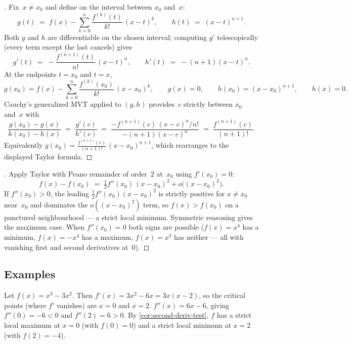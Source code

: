 \begin{proof}[]
Fix~$x \neq x_0$ and define on the interval between $x_0$ and~$x$:
\[
  g(t) \;=\; f(x) - \sum_{k=0}^{n} \frac{f^{(k)}(t)}{k!}\,(x - t)^k,
  \qquad
  h(t) \;=\; (x - t)^{n+1}.
\]
Both $g$ and $h$ are differentiable on the chosen interval; computing
$g'$ telescopically (every term except the last cancels) gives
\[
  g'(t) \;=\; -\frac{f^{(n+1)}(t)}{n!}\,(x - t)^n,
  \qquad
  h'(t) \;=\; -(n+1)(x - t)^n.
\]
At the endpoints $t = x_0$ and $t = x$,
\[
  g(x_0) = f(x) - \sum_{k=0}^{n} \frac{f^{(k)}(x_0)}{k!}\,(x - x_0)^k,
  \qquad
  g(x) = 0,
  \qquad
  h(x_0) = (x - x_0)^{n+1},
  \qquad
  h(x) = 0.
\]
Cauchy's generalized MVT applied to $(g, h)$ provides~$c$ strictly
between $x_0$ and~$x$ with
\[
  \frac{g(x_0) - g(x)}{h(x_0) - h(x)} \;=\; \frac{g'(c)}{h'(c)}
  \;=\; \frac{-f^{(n+1)}(c)\,(x - c)^n / n!}{-(n+1)(x - c)^n}
  \;=\; \frac{f^{(n+1)}(c)}{(n+1)!}.
\]
Equivalently
$g(x_0) = \frac{f^{(n+1)}(c)}{(n+1)!}\,(x - x_0)^{n+1}$, which
rearranges to the displayed Taylor formula.
\end{proof}

\begin{proof}[]
Apply Taylor with Peano remainder of order~$2$ at~$x_0$ using
$f'(x_0) = 0$:
\[
  f(x) - f(x_0) \;=\; \tfrac{1}{2} f''(x_0)\,(x - x_0)^2 + o\bigl((x - x_0)^2\bigr).
\]
If $f''(x_0) > 0$, the leading $\tfrac{1}{2}f''(x_0)(x - x_0)^2$ is
strictly positive for $x \neq x_0$ near~$x_0$ and dominates the
$o((x - x_0)^2)$ term, so $f(x) > f(x_0)$ on a punctured
neighbourhood — a strict local minimum. Symmetric reasoning gives
the maximum case. When $f''(x_0) = 0$ both signs are possible
($f(x) = x^4$ has a minimum, $f(x) = -x^4$ has a maximum, $f(x) = x^3$
has neither — all with vanishing first and second derivatives at~$0$).
\end{proof}

\subsection*{Examples}

\begin{example}
\label{ex:cubic-extrema}
Let $f(x) = x^3 - 3x^2$. Then $f'(x) = 3x^2 - 6x = 3x(x - 2)$, so the
critical points (where $f'$ vanishes) are $x = 0$ and $x = 2$.
$f''(x) = 6x - 6$, giving $f''(0) = -6 < 0$ and $f''(2) = 6 > 0$.
By \cref{cor:second-deriv-test}, $f$ has a strict local maximum at
$x = 0$ (with $f(0) = 0$) and a strict local minimum at $x = 2$
(with $f(2) = -4$).
\end{example}

